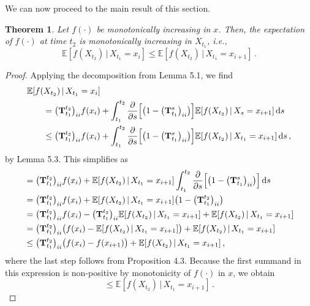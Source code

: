 \documentclass[10pt]{article}
\newtheorem{theorem}{Theorem}[section]
\newcommand{\dx}[1][x]{\text{\,d}#1}
\begin{document}
We can now proceed to the main result of this section.
\begin{theorem}
Let $f(\cdot)$ be monotonically increasing in $x$. Then, the expectation of $f(\cdot)$ at time $t_2$ is monotonically increasing in $X_{t_1}$, i.e.,
\begin{equation*}
\mathbb{E}[f(X_{t_2})\,\vert\,X_{t_1}=x_i] \leq \mathbb{E}[f(X_{t_2})\,\vert\,X_{t_1}=x_{i+1}]\,.
\end{equation*}
\end{theorem}
\begin{proof}
Applying the decomposition from Lemma 5.1, we find
\begin{align*}
\mathbb{E}[f(X_{t_2})\,\vert\,X_{t_1}=x_i] & \\
 = \bigl(\mathbf{T}_{t_1}^{t_2}\bigr)_{ii}f(x_i) &+ \int_{t_1}^{t_2} \frac{\partial}{\partial s}\Bigl[\bigl(1-\bigl(\mathbf{T}_{t_1}^s\bigr)_{ii}\bigr)\Bigr]\mathbb{E}[f(X_{t_2})\,\vert\,X_s=x_{i+1}]\dx[s] \\
 \leq \bigl(\mathbf{T}_{t_1}^{t_2}\bigr)_{ii}f(x_i) &+ \int_{t_1}^{t_2} \frac{\partial}{\partial s}\Bigl[\bigl(1-\bigl(\mathbf{T}_{t_1}^s\bigr)_{ii}\bigr)\Bigr]\mathbb{E}[f(X_{t_2})\,\vert\,X_{t_1}=x_{i+1}]\dx[s]\,,
\end{align*}
by Lemma 5.3. This simplifies as
\begin{align*}
 &= \bigl(\mathbf{T}_{t_1}^{t_2}\bigr)_{ii}f(x_i) + \mathbb{E}[f(X_{t_2})\,\vert\,X_{t_1}=x_{i+1}]\int_{t_1}^{t_2} \frac{\partial}{\partial s}\Bigl[\bigl(1-\bigl(\mathbf{T}_{t_1}^s\bigr)_{ii}\bigr)\Bigr]\dx[s] \\
 &= \bigl(\mathbf{T}_{t_1}^{t_2}\bigr)_{ii}f(x_i) + \mathbb{E}[f(X_{t_2})\,\vert\,X_{t_1}=x_{i+1}]\bigl(1-\bigl(\mathbf{T}_{t_1}^{t_2}\bigr)_{ii}\bigr) \\
 &= \bigl(\mathbf{T}_{t_1}^{t_2}\bigr)_{ii}f(x_i) - \bigl(\mathbf{T}_{t_1}^{t_2}\bigr)_{ii}\mathbb{E}[f(X_{t_2})\,\vert\,X_{t_1}=x_{i+1}] + \mathbb{E}[f(X_{t_2})\,\vert\,X_{t_1}=x_{i+1}] \\
 &= \bigl(\mathbf{T}_{t_1}^{t_2}\bigr)_{ii}\bigl(f(x_i) - \mathbb{E}[f(X_{t_2})\,\vert\,X_{t_1}=x_{i+1}]\bigr) + \mathbb{E}[f(X_{t_2})\,\vert\,X_{t_1}=x_{i+1}] \\
 &\leq \bigl(\mathbf{T}_{t_1}^{t_2}\bigr)_{ii}\bigl(f(x_i) - f(x_{i+1})\bigr) + \mathbb{E}[f(X_{t_2})\,\vert\,X_{t_1}=x_{i+1}]\,,
\end{align*}
where the last step follows from Proposition 4.3. Because the first summand in this expression is non-positive by monotonicity of $f(\cdot)$ in $x$, we obtain
\begin{equation*}
\leq \mathbb{E}[f(X_{t_2})\,\vert\,X_{t_1}=x_{i+1}]\,.
\end{equation*}
\end{proof}
\end{document}
